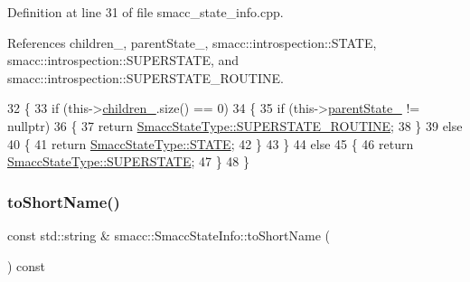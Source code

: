 Definition at line 31 of file smacc\+\_\+state\+\_\+info.\+cpp.



References children\+\_\+, parent\+State\+\_\+, smacc\+::introspection\+::\+S\+T\+A\+TE, smacc\+::introspection\+::\+S\+U\+P\+E\+R\+S\+T\+A\+TE, and smacc\+::introspection\+::\+S\+U\+P\+E\+R\+S\+T\+A\+T\+E\+\_\+\+R\+O\+U\+T\+I\+NE.


\begin{DoxyCode}
32 \{
33     \textcolor{keywordflow}{if} (this->\hyperlink{classsmacc_1_1introspection_1_1SmaccStateInfo_a73eac049e8149b6eaeec735101c32ef9}{children\_}.size() == 0)
34     \{
35         \textcolor{keywordflow}{if} (this->\hyperlink{classsmacc_1_1introspection_1_1SmaccStateInfo_afa49a141d2ccdb3d6f9676ed380ce006}{parentState\_} != \textcolor{keyword}{nullptr})
36         \{
37             \textcolor{keywordflow}{return} \hyperlink{namespacesmacc_1_1introspection_a710cf406873961567c11027582c7f720a6d39c20504d2f2afe9c8c27351e61d20}{SmaccStateType::SUPERSTATE\_ROUTINE};
38         \}
39         \textcolor{keywordflow}{else}
40         \{
41             \textcolor{keywordflow}{return} \hyperlink{namespacesmacc_1_1introspection_a710cf406873961567c11027582c7f720a2b848a8cc886d253d21a77c43cd50aae}{SmaccStateType::STATE};
42         \}
43     \}
44     \textcolor{keywordflow}{else}
45     \{
46         \textcolor{keywordflow}{return} \hyperlink{namespacesmacc_1_1introspection_a710cf406873961567c11027582c7f720a4da54a31b31f1c863864fdee05fc35c8}{SmaccStateType::SUPERSTATE};
47     \}
48 \}
\end{DoxyCode}
\mbox{\label{classsmacc_1_1introspection_1_1SmaccStateInfo_a39d7f8a587087b6abd0752058e2d8301}} 
\subsubsection{\texorpdfstring{to\+Short\+Name()}{toShortName()}}
{\footnotesize\ttfamily const std\+::string \& smacc\+::\+Smacc\+State\+Info\+::to\+Short\+Name (\begin{DoxyParamCaption}{ }\end{DoxyParamCaption}) const}



